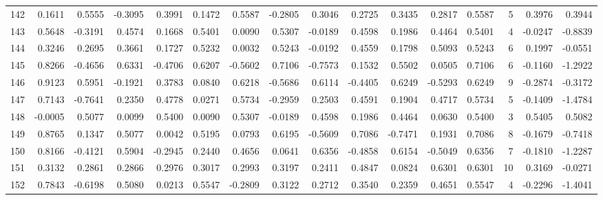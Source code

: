 \begin{tabular}{lrrrrrrrrrrrrrrr}
142 &      0.1611 &  0.5555 & -0.3095 &  0.3991 &  0.1472 &  0.5587 & -0.2805 &  0.3046 &  0.2725 &  0.3435 &   0.2817 &     0.5587 &      5 &                    0.3976 &                     0.3944 \\
143 &      0.5648 & -0.3191 &  0.4574 &  0.1668 &  0.5401 &  0.0090 &  0.5307 & -0.0189 &  0.4598 &  0.1986 &   0.4464 &     0.5401 &      4 &                   -0.0247 &                    -0.8839 \\
144 &      0.3246 &  0.2695 &  0.3661 &  0.1727 &  0.5232 &  0.0032 &  0.5243 & -0.0192 &  0.4559 &  0.1798 &   0.5093 &     0.5243 &      6 &                    0.1997 &                    -0.0551 \\
145 &      0.8266 & -0.4656 &  0.6331 & -0.4706 &  0.6207 & -0.5602 &  0.7106 & -0.7573 &  0.1532 &  0.5502 &   0.0505 &     0.7106 &      6 &                   -0.1160 &                    -1.2922 \\
146 &      0.9123 &  0.5951 & -0.1921 &  0.3783 &  0.0840 &  0.6218 & -0.5686 &  0.6114 & -0.4405 &  0.6249 &  -0.5293 &     0.6249 &      9 &                   -0.2874 &                    -0.3172 \\
147 &      0.7143 & -0.7641 &  0.2350 &  0.4778 &  0.0271 &  0.5734 & -0.2959 &  0.2503 &  0.4591 &  0.1904 &   0.4717 &     0.5734 &      5 &                   -0.1409 &                    -1.4784 \\
148 &     -0.0005 &  0.5077 &  0.0099 &  0.5400 &  0.0090 &  0.5307 & -0.0189 &  0.4598 &  0.1986 &  0.4464 &   0.0630 &     0.5400 &      3 &                    0.5405 &                     0.5082 \\
149 &      0.8765 &  0.1347 &  0.5077 &  0.0042 &  0.5195 &  0.0793 &  0.6195 & -0.5609 &  0.7086 & -0.7471 &   0.1931 &     0.7086 &      8 &                   -0.1679 &                    -0.7418 \\
150 &      0.8166 & -0.4121 &  0.5904 & -0.2945 &  0.2440 &  0.4656 &  0.0641 &  0.6356 & -0.4858 &  0.6154 &  -0.5049 &     0.6356 &      7 &                   -0.1810 &                    -1.2287 \\
151 &      0.3132 &  0.2861 &  0.2866 &  0.2976 &  0.3017 &  0.2993 &  0.3197 &  0.2411 &  0.4847 &  0.0824 &   0.6301 &     0.6301 &     10 &                    0.3169 &                    -0.0271 \\
152 &      0.7843 & -0.6198 &  0.5080 &  0.0213 &  0.5547 & -0.2809 &  0.3122 &  0.2712 &  0.3540 &  0.2359 &   0.4651 &     0.5547 &      4 &                   -0.2296 &                    -1.4041 \\

\end{tabular}
